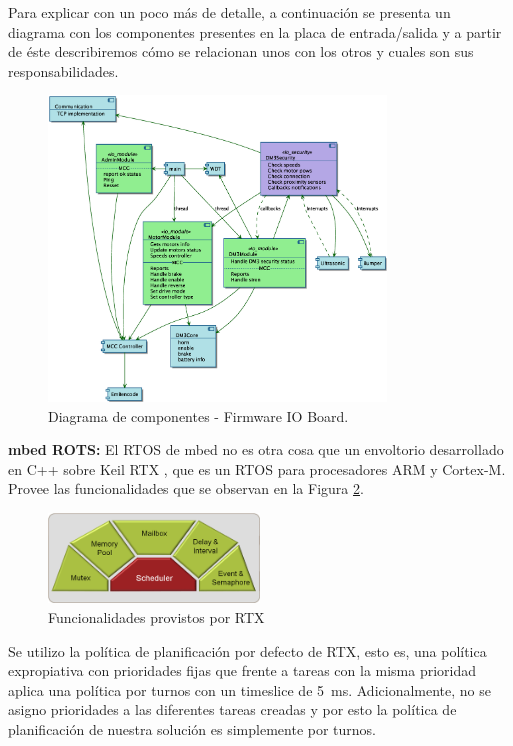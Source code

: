 \documentclass[withindex,glossary]{cam-thesis}
\begin{document}
Para explicar con un poco más de detalle, a continuación se presenta un diagrama con los componentes presentes en la placa de entrada/salida y a partir de éste describiremos cómo se relacionan unos con los otros y cuales son sus responsabilidades.

\begin{figure}[H]
\centering
\includegraphics[width=0.8\textwidth]{images/DM3_IOBoard_Components}
\caption[Diagrama de componentes IO Board]{Diagrama de componentes - Firmware IO Board.}
\label{fig: Diagrama de componentes - Firmware IO Board}
\end{figure}

\textbf{mbed ROTS:} El RTOS de mbed no es otra cosa que un envoltorio desarrollado en C++ sobre Keil RTX \cite{KeilRTX}, que es un RTOS para procesadores ARM y Cortex-M. Provee las funcionalidades que se observan en la Figura \ref{fig: RTX}.

\begin{figure}[H]
  \centering
  \includegraphics[width=0.5\textwidth]{images/rtx}
  \caption[RTOS - Funcionalidades provistos por RTX]{Funcionalidades provistos por RTX}
  \label{fig: RTX}
\end{figure}

Se utilizo la política de planificación por defecto de RTX, esto es, una política expropiativa con prioridades fijas que frente a tareas con la misma prioridad aplica una política por turnos con un timeslice de \SI{5}{\milli\second}. Adicionalmente, no se asigno prioridades a las diferentes tareas creadas y por esto la política de planificación de nuestra solución es simplemente por turnos.
\end{document}
